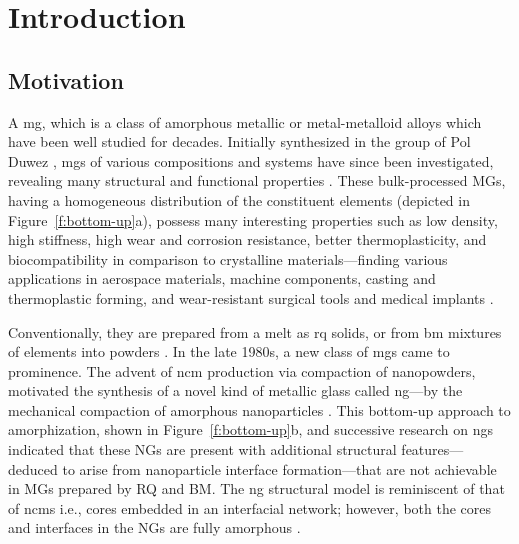 \chapter{Introduction} \label{c:intro}

\section{Motivation}
A \Gls{mg}, which is a class of amorphous metallic or metal-metalloid alloys which have been well studied for decades. Initially synthesized in the group of Pol Duwez \cite{Klement1960}, \gls{mg}s of various compositions and systems have since been investigated, revealing many structural and functional properties \cite{Greer1995,Suryanarayana2001,Trexler2010,Berthier2016}. These bulk-processed MGs, having a homogeneous distribution of the constituent elements (depicted in Figure~\ref{f:bottom-up}a), possess many interesting properties such as low density, high stiffness, high wear and corrosion resistance, better thermoplasticity, and biocompatibility in comparison to crystalline materials---finding various %
applications in aerospace materials, machine components, casting and thermoplastic forming, and wear-resistant surgical tools and medical implants \cite{Johnson2002,Nu2016}. \par

Conventionally, they are prepared from a melt as \gls{rq} solids, or from \gls{bm} mixtures of elements into powders \cite{Klement1960,Weeber1988,Duwez1960,Greer1995}. In the late 1980s, a new class of \gls{mg}s came to prominence. The advent of \gls{ncm} production via compaction of nanopowders, motivated the synthesis of a novel kind of metallic glass called \gls{ng}---by the mechanical compaction of amorphous nanoparticles \cite{Jing1989,Gleiter2014}. This bottom-up approach to amorphization, shown in Figure~\ref{f:bottom-up}b, and successive research on \gls{ng}s \cite{Gleiter2014,Ivanisenko2018,Fang2012,Ghafari2012,Weissmuller1992,Gleiter2016,Witte2013} indicated that these NGs are present with additional structural features---deduced to arise from nanoparticle interface formation---that are not achievable in MGs prepared by RQ and BM. The \gls{ng} structural model is reminiscent of that of \gls{ncm}s i.e., cores embedded in an interfacial network; however, both the cores and interfaces in the NGs are fully amorphous \cite{Ivanisenko2018,Nandam2017,Sopu2009,Adjaoud2018,Cheng2019}. \par

